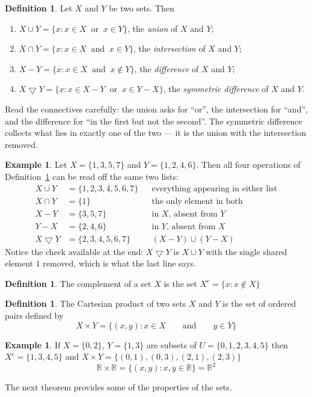 \documentclass[11pt,a4paper]{article}
\theoremstyle{definition}
\newtheorem{defn}[thm]{Definition}
\newtheorem{exa}[thm]{Example}
\begin{document}
\begin{defn}\label{defn:set-operations}
Let $X$ and $Y$ be two sets. Then
\begin{enumerate}
\item[i.] $X\cup Y=\{x: x\in X \ \text{ or }\ x\in Y\}$, the \emph{union} of
      $X$ and $Y$;
\item[ii.] $X\cap Y=\{x: x\in X \ \text{ and }\ x\in Y\}$, the
      \emph{intersection} of $X$ and $Y$;
\item[iii.] $X-Y=\{x: x\in X \ \text{ and }\ x\notin Y\}$, the
      \emph{difference} of $X$ and $Y$;
\item[iv.] $X\bigtriangledown Y=\{x: x\in X-Y \ \text{ or }\ x\in Y-X\}$, the
      \emph{symmetric difference} of $X$ and $Y$.
\end{enumerate}
Read the connectives carefully: the union asks for ``or'', the intersection for
``and'', and the difference for ``in the first but not the second''. The
symmetric difference collects what lies in exactly one of the two --- it is the
union with the intersection removed.
\end{defn}

\begin{exa}
Let $X=\{1,3,5,7\}$ and $Y=\{1,2,4,6\}$. Then all four operations of
Definition~\ref{defn:set-operations} can be read off the same two lists:
\begin{align*}
X\cup Y &=\{1,2,3,4,5,6,7\} &&\text{everything appearing in either list}\\
X\cap Y &=\{1\} &&\text{the only element in both}\\
X-Y &=\{3,5,7\} &&\text{in }X\text{, absent from }Y\\
Y-X &=\{2,4,6\} &&\text{in }Y\text{, absent from }X\\
X\bigtriangledown Y &=\{2,3,4,5,6,7\} &&(X-Y)\cup(Y-X)
\end{align*}
Notice the check available at the end: $X\bigtriangledown Y$ is $X\cup Y$ with
the single shared element $1$ removed, which is what the last line says.
\end{exa}


\begin{defn}
The complement of a set $X$ is the set $X^c=\{x:x\not\in X\}$
\end{defn}
\begin{defn}
The Cartesian product of two sets $X$ and $Y$ is the set of ordered pairs defined by $$X\times Y=\{(x,y):x\in X\qquad\text{and}\qquad  y\in Y\}$$
\end{defn}
\begin{exa}
If $X=\{0,2\}$, $Y=\{1,3\}$ are subsets of $U=\{0,1,2,3,4,5\}$ then $X^c=\{1,3,4,5\}$ and $X\times Y=\{(0,1),(0,3),(2,1),(2,3)\}$
$$\mathbb{R}\times \mathbb{R}=\{(x,y):x,y\in \mathbb{R}\}=\mathbb{R}^2$$


\end{exa}
The next theorem provides some of the properties of the sets.
\end{document}
